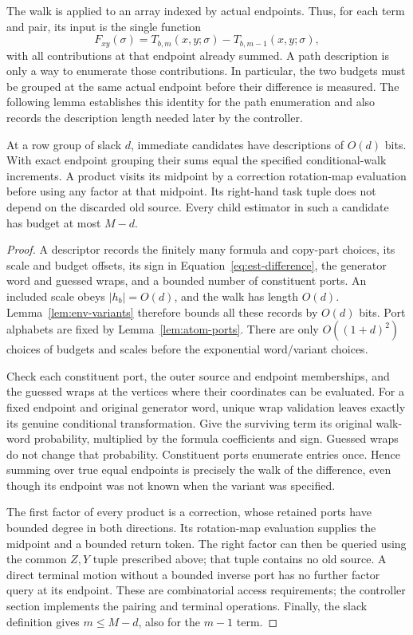 The walk is applied to an array indexed by actual endpoints.  Thus,
for each term and pair, its input is the single function
\[
 F_{xy}(\sigma)=T_{b,m}(x,y;\sigma)-T_{b,m-1}(x,y;\sigma),
\]
with all contributions at that endpoint already summed.  A path
description is only a way to enumerate those contributions.  In
particular, the two budgets must be grouped at the same actual
endpoint before their difference is measured.  The following lemma
establishes this identity for the path enumeration and also records
the description length needed later by the controller.

\begin{lemma}\label{lem:est-paths}
At a row group of slack $d$, immediate candidates have descriptions of
$O(d)$ bits.  With exact endpoint grouping their sums equal the specified
conditional-walk increments.  A product visits its midpoint by a correction rotation-map evaluation before using any factor at that midpoint.  Its right-hand
task tuple does not depend on the discarded old source.  Every child
estimator in such a candidate has budget at most $M-d$.
\end{lemma}
\begin{proof}
A descriptor records the finitely many formula and copy-part choices, its
scale and budget offsets, its sign in Equation~\eqref{eq:est-difference},
the generator word and guessed wraps, and a bounded number of constituent
ports.  An included scale obeys $|h_b|=O(d)$, and the walk has length
$O(d)$.  Lemma~\ref{lem:env-variants} therefore bounds all these records by
$O(d)$ bits.  Port alphabets are fixed by Lemma~\ref{lem:atom-ports}.
There are only $O((1+d)^2)$ choices of budgets and scales before the
exponential word/variant choices.

Check each constituent port, the outer source and endpoint memberships,
and the guessed wraps at the vertices where their coordinates can be
evaluated.  For a fixed endpoint and original generator word, unique wrap
validation leaves exactly its genuine conditional transformation.
Give the surviving term its original walk-word probability, multiplied
by the formula coefficients and sign.  Guessed wraps do not change that
probability.  Constituent ports enumerate entries once.  Hence summing
over true equal endpoints is precisely the walk of the difference, even
though its endpoint was not known when the variant was specified.

The first factor of every product is a correction, whose retained ports
have bounded degree in both directions.  Its rotation-map evaluation supplies the
midpoint and a bounded return token.  The right factor can then be queried
using the common $Z,Y$ tuple prescribed above; that tuple contains no old
source.  A direct terminal motion without a bounded inverse port has no further factor query
at its endpoint.  These are combinatorial access requirements; the
controller section implements the pairing and terminal operations.
Finally, the slack definition gives $m\le M-d$, also for the $m-1$ term.
\end{proof}


